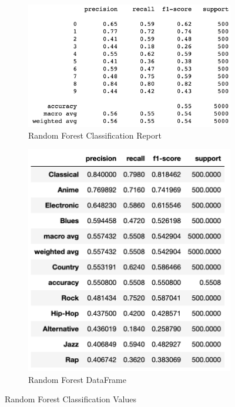 \documentclass[12pt]{article}
\begin{document}
\begin{figure}[h]
    \centering
    \begin{subfigure}{0.45\textwidth}
        \centering
        \includegraphics[width=\textwidth]{classification_report.png}
        \caption{Random Forest Classification Report}
        \label{fig:image1}
    \end{subfigure}
    \hfill
    \begin{subfigure}{0.45\textwidth}
        \centering
        \includegraphics[width=\textwidth]{classification_df.png}
        \caption{Random Forest DataFrame}
        \label{fig:image2}
    \end{subfigure}
    \caption{Random Forest Classification Values}
    \label{fig:double_image}
\end{figure}
\end{document}
